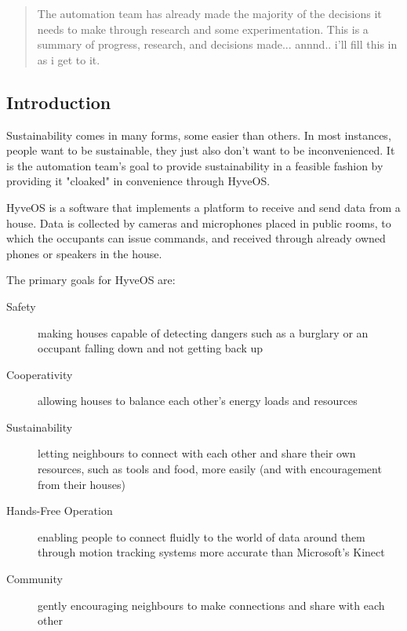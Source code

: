 


\maketitle

\begin{abstract}
The automation team has already made the majority of the decisions it needs to make through research and some experimentation.
This is a summary of progress, research, and decisions made...
annnd.. i'll fill this in as i get to it.
\end{abstract}

\begin{multicols}{2}

\section{Introduction}

	Sustainability comes in many forms, some easier than others.
	In most instances, people want to be sustainable, they just also don't want to be inconvenienced.
	It is the automation team's goal to provide sustainability in a feasible fashion by providing it "cloaked" in convenience through HyveOS.
	
	HyveOS is a software that implements a platform to receive and send data from a house. 
	Data is collected by cameras and microphones placed in public rooms, to which the occupants can issue commands, and received through already owned phones or speakers in the house.
	
	The primary goals for HyveOS are:
	\begin{description}
		\item[Safety] making houses capable of detecting dangers such as a burglary or an occupant falling down and not getting back up
		\item[Cooperativity] allowing houses to balance each other's energy loads and resources
		\item[Sustainability] letting neighbours to connect with each other and share their own resources, such as tools and food, more easily (and with encouragement from their houses)
		\item[Hands-Free Operation] enabling people to connect fluidly to the world of data around them through motion tracking systems more accurate than Microsoft's Kinect
		\item[Community] gently encouraging neighbours to make connections and share with each other
	\end{description}


\end{multicols}
